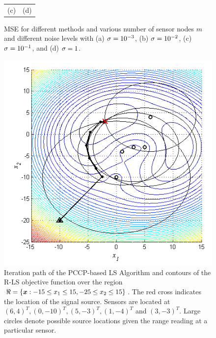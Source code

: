 \begin{figure}[t]
\begin{tabular}{cc}
    \\  (c)&  (d)   \\
\end{tabular}
\caption{MSE for different methods and various number of sensor nodes $m$ and different noise levels with (a) $\protect\sigma = 10\protect^{-3}$, (b) $\protect\sigma = 10\protect^{-2}$, (c) $\protect\sigma = 10\protect^{-1}$, and (d) $\protect\sigma = 1$.} \label{fig:MSE}
\end{figure}

\begin{figure} \label{fig:path}
\centering
\includegraphics{figures/ccp/iteration_path}
\caption{Iteration path of the PCCP-based LS Algorithm and contours of the R-LS objective function over the region $\protect\Re = \protect\lbrace \protect\mbox{\boldmath$x$}:-15\protect\leq x_1 \protect\leq 15, -25\protect\leq x_2 \protect\leq 15 \protect\rbrace$. The red cross indicates the location of the signal source. Sensors are located at $(6,4)^T, (0,-10)^T, (5,-3)^T, (1,-4)^T$ and  $(3,-3)^T$. Large circles denote possible source locations given the range reading at a particular sensor.}
\end{figure}

